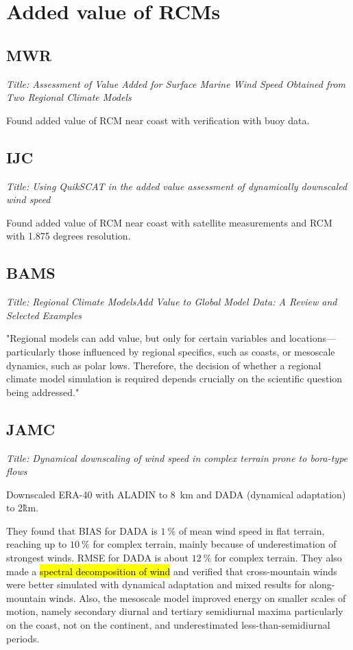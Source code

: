 \documentclass[12pt,a4paper]{article}
\begin{document}
\section{Added value of RCMs}

\subsection{\cite{Winterfeldt2009} MWR}

\textit{Title: Assessment of Value Added for Surface Marine Wind Speed Obtained from Two Regional Climate Models}

Found added value of RCM near coast with verification with buoy data.

\subsection{\cite{Winterfeldt2011} IJC }

\textit{Title: Using QuikSCAT in the added value assessment of dynamically downscaled wind speed}

Found added value of RCM near coast with satellite measurements and RCM with 1.875 degrees resolution. 

\subsection{\cite{Feser2011} BAMS}

\textit{Title: Regional Climate ModelsAdd Value to Global Model Data: A Review and Selected Examples}

"Regional models can add value, but only for certain variables and locations—particularly those influenced by regional specifics, such as coasts, or mesoscale dynamics, such as polar lows. Therefore, the decision of whether a regional climate model simulation is required depends crucially on the scientific question being addressed."

\subsection{\cite{Horvath2011} JAMC}

\textit{Title: Dynamical downscaling of wind speed in complex terrain prone to bora-type flows}

Downscaled ERA-40 with ALADIN to 8~km and DADA (dynamical adaptation) to 2\~km. 

They found that BIAS for DADA is $1~\%$ of mean wind speed in flat terrain, reaching up to $10~\%$ for complex terrain, mainly because of underestimation of strongest winds. RMSE for DADA is about $12~\%$ for complex terrain. They also made a \hl{spectral decomposition of wind} and verified that cross-mountain winds were better simulated with dynamical adaptation and mixed results for along-mountain winds. Also, the mesoscale model improved energy on smaller scales of motion, namely secondary diurnal and tertiary semidiurnal maxima particularly on the coast, not on the continent, and underestimated less-than-semidiurnal periods.
\end{document}
